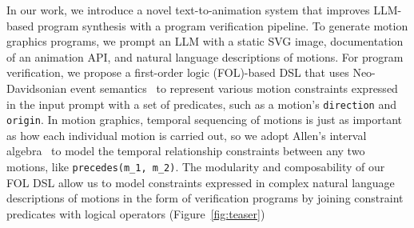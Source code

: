 In our work, we introduce a novel text-to-animation system that
improves LLM-based program synthesis with a program verification
pipeline.
To generate motion graphics programs, we prompt an LLM with a static
SVG image, documentation of an animation API, and natural language
descriptions of motions.
For program verification, we propose a first-order logic (FOL)-based
DSL that uses Neo-Davidsonian event
semantics~\cite{davidson2001logical, parsons1990events} to represent
various motion constraints expressed in the input prompt with a set of
predicates, such as a motion's \texttt{direction} and \texttt{origin}.
In motion graphics, temporal sequencing of motions is just as
important as how each individual motion is carried out, so we adopt
Allen's interval algebra~ to model the
temporal relationship constraints between any two motions, like
\texttt{precedes(m\_1, m\_2)}.
The modularity and composability of our FOL DSL allow us to model
constraints expressed in complex natural language descriptions of
motions in the form of verification programs by joining constraint
predicates with logical operators (Figure~\ref{fig:teaser})

